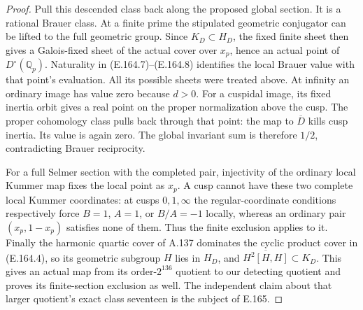\begin{proof}
Pull this descended class back along the proposed global
section.  It is a rational Brauer class.  At a finite
prime the stipulated geometric conjugator can be lifted
to the full geometric group.  Since $K_D\subset H_D$,
the fixed finite sheet then gives a Galois-fixed sheet
of the actual cover over $x_p$, hence an actual point of
$D^\circ(\mathbb Q_p)$.  Naturality in (E.164.7)--(E.164.8)
identifies the local Brauer value with that point's
evaluation.  All its possible sheets were treated above.
At infinity an ordinary image has value zero because
$d>0$.  For a cuspidal image, its fixed inertia orbit
gives a real point on the proper normalization above
the cusp.  The proper cohomology class pulls back through
that point: the map to $\overline D$ kills cusp inertia.
Its value is again zero.  The global invariant sum is
therefore $1/2$, contradicting Brauer reciprocity.

For a full Selmer section with the completed pair,
injectivity of the ordinary local Kummer map fixes
the local point as $x_p$.  A cusp cannot have these
two complete local Kummer coordinates: at cusps
$0,1,\infty$ the regular-coordinate conditions respectively
force $B=1$, $A=1$, or $B/A=-1$ locally, whereas an ordinary
pair $(x_p,1-x_p)$ satisfies none of them.  Thus the finite
exclusion applies to it.  Finally the harmonic quartic
cover of A.137 dominates the cyclic product cover in
(E.164.4), so its geometric subgroup $H$ lies in $H_D$,
and $\overline{H^2[H,H]}\subset K_D$.  This gives an actual
map from its order-$2^{136}$ quotient to our detecting
quotient and proves its finite-section exclusion as well.
The independent claim about that larger quotient's exact
class seventeen is the subject of E.165.
\end{proof}

